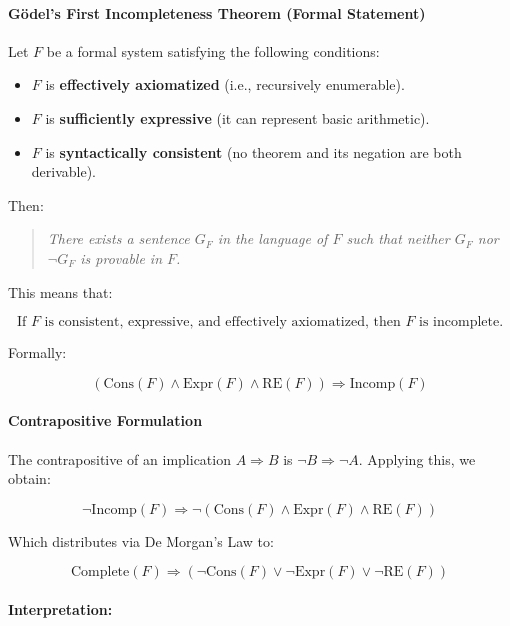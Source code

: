 \documentclass[12pt]{article}
\begin{document}
\paragraph{Gödel’s First Incompleteness Theorem (Formal Statement)}

Let \( F \) be a formal system satisfying the following conditions:

\begin{itemize}
    \item \( F \) is \textbf{effectively axiomatized} (i.e., recursively enumerable).
    \item \( F \) is \textbf{sufficiently expressive} (it can represent basic arithmetic).
    \item \( F \) is \textbf{syntactically consistent} (no theorem and its negation are both derivable).
\end{itemize}

Then:

\begin{quote}
\textit{There exists a sentence \( G_F \) in the language of \( F \) such that neither \( G_F \) nor \( \neg G_F \) is provable in \( F \).}
\end{quote}

This means that:

\[
\text{If } F \text{ is consistent, expressive, and effectively axiomatized, then } F \text{ is incomplete.}
\]

Formally:

\[
(\mathrm{Cons}(F) \wedge \mathrm{Expr}(F) \wedge \mathrm{RE}(F)) \Rightarrow \mathrm{Incomp}(F)
\]

\paragraph{Contrapositive Formulation}

The contrapositive of an implication \( A \Rightarrow B \) is \( \neg B \Rightarrow \neg A \). Applying this, we obtain:

\[
\neg \mathrm{Incomp}(F) \Rightarrow \neg (\mathrm{Cons}(F) \wedge \mathrm{Expr}(F) \wedge \mathrm{RE}(F))
\]

Which distributes via De Morgan’s Law to:

\[
\mathrm{Complete}(F) \Rightarrow (\neg \mathrm{Cons}(F) \vee \neg \mathrm{Expr}(F) \vee \neg \mathrm{RE}(F))
\]

\paragraph{Interpretation:}
\end{document}
